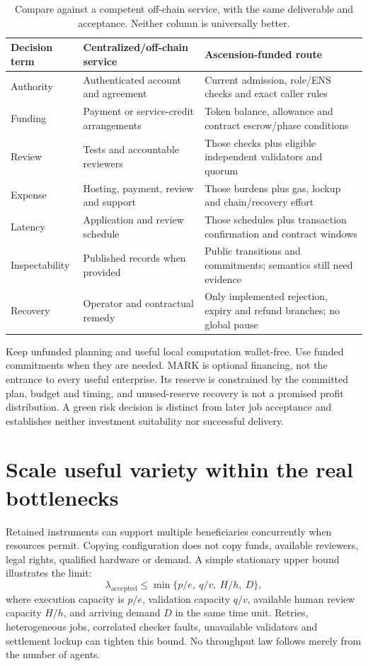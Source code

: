 \documentclass[11pt,letterpaper]{article}
\begin{document}
\begin{table}[htbp]\centering\small
\caption{Compare against a competent off-chain service, with the same deliverable and acceptance. Neither column is universally better.}
\begin{tabularx}{\linewidth}{@{}P{2.7cm}YY@{}}\toprule
Decision term & Centralized/off-chain service & Ascension-funded route\\\midrule
Authority & Authenticated account and agreement & Current admission, role/ENS checks and exact caller rules\\
Funding & Payment or service-credit arrangements & Token balance, allowance and contract escrow/phase conditions\\
Review & Tests and accountable reviewers & Those checks plus eligible independent validators and quorum\\
Expense & Hosting, payment, review and support & Those burdens plus gas, lockup and chain/recovery effort\\
Latency & Application and review schedule & Those schedules plus transaction confirmation and contract windows\\
Inspectability & Published records when provided & Public transitions and commitments; semantics still need evidence\\
Recovery & Operator and contractual remedy & Only implemented rejection, expiry and refund branches; no global pause\\\bottomrule
\end{tabularx}
\end{table}

Keep unfunded planning and useful local computation wallet-free. Use funded commitments when they are needed. MARK is optional financing, not the entrance to every useful enterprise. Its reserve is constrained by the committed plan, budget and timing, and unused-reserve recovery is not a promised profit distribution. A green risk decision is distinct from later job acceptance and establishes neither investment suitability nor successful delivery.

\section{Scale useful variety within the real bottlenecks}
Retained instruments can support multiple beneficiaries concurrently when resources permit. Copying configuration does not copy funds, available reviewers, legal rights, qualified hardware or demand. A simple stationary upper bound illustrates the limit:
\begin{equation}
\lambda_{\mathrm{accepted}}\leq\min\{p/e,\ q/v,\ H/h,\ D\},
\end{equation}
where execution capacity is $p/e$, validation capacity $q/v$, available human review capacity $H/h$, and arriving demand $D$ in the same time unit. Retries, heterogeneous jobs, correlated checker faults, unavailable validators and settlement lockup can tighten this bound. No throughput law follows merely from the number of agents.
\end{document}
